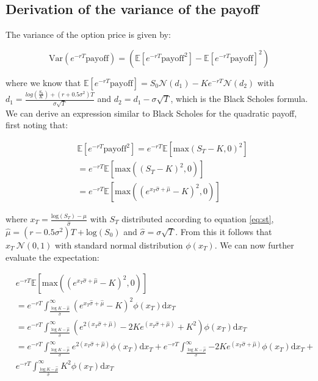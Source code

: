 \documentclass[11pt,a4paper]{article}
\begin{document}
\subsection{Derivation of the variance of the payoff}

The variance of the option price is given by:

\begin{equation}
  \text{Var}(e^{-rT}\text{payoff}) = (\mathbb{E}[e^{-rT}\text{payoff}^2] - \mathbb{E}[e^{-rT}\text{payoff}]^2)
\end{equation}

where we know that $\mathbb{E}[e^{-rT}\text{payoff}] = S_0\mathcal{N}(d_1) - Ke^{-rT}\mathcal{N}(d_2)$ with $d_1 = \frac{log(\frac{S_0}{K}) + (r + 0.5\sigma^2)T}{\sigma \sqrt{T}}$ and $d_2 = d_1 - \sigma \sqrt{T}$, which is the Black Scholes formula. We can derive an expression similar to Black Scholes for the quadratic payoff, first noting that:

\begin{align}
  &\mathbb{E}[e^{-rT}\text{payoff}^2] = e^{-rT}\mathbb{E}[\text{max}(S_T-K,0)^2] \nonumber \\
  & = e^{-rT}\mathbb{E}[\text{max}((S_T-K)^2,0)] \nonumber \\
  & = e^{-rT}\mathbb{E}[\text{max}((e^{x_T \hat{\sigma} + \hat{\mu}} - K)^2,0)]
\end{align}

where $x_T = \frac{\text{log}(S_T) - \hat{\mu}}{\hat{\sigma}}$ with $S_T$ distributed according to equation \ref{eq:st}, $\hat{\mu} = (r - 0.5\sigma^2)T + \text{log}(S_0)$ and $\hat{\sigma} = \sigma \sqrt{T}$. From this it follows that $x_T ~ \mathcal{N}(0,1)$ with standard normal distribution $\phi(x_T)$. We can now further evaluate the expectation:

\begin{align}
  &e^{-rT}\mathbb{E}[\text{max}((e^{x_T \hat{\sigma} + \hat{\mu}} - K)^2,0)] \nonumber \\
  & = e^{-rT}\int_{\frac{\log K -\hat{\mu}}{\hat{\sigma}}}^{\infty}{(e^{x_T\hat{\sigma}+\hat{\mu}}-K)^2\phi(x_T)}\mathrm{d}x_T \nonumber \\
  & = e^{-rT}\int_{\frac{\log K -\hat{\mu}}{\hat{\sigma}}}^{\infty}{(e^{2(x_T\hat{\sigma}+\hat{\mu})}-2Ke^{(x_T\hat{\sigma}+\hat{\mu})}+K^2)\phi(x_T)}\mathrm{d}x_T \nonumber \\
  & = e^{-rT}\int_{\frac{\log K -\hat{\mu}}{\hat{\sigma}}}^{\infty}{e^{2(x_T\hat{\sigma}+\hat{\mu})}\phi(x_T)}\mathrm{d}x_T +
  e^{-rT}\int_{\frac{\log K -\hat{\mu}}{\hat{\sigma}}}^{\infty}{-2Ke^{(x_T\hat{\sigma}+\hat{\mu})}\phi(x_T)}\mathrm{d}x_T + \nonumber \\
  & e^{-rT}\int_{\frac{\log K -\hat{\mu}}{\hat{\sigma}}}^{\infty}{K^2\phi(x_T)}\mathrm{d}x_T
\end{align}
\end{document}
